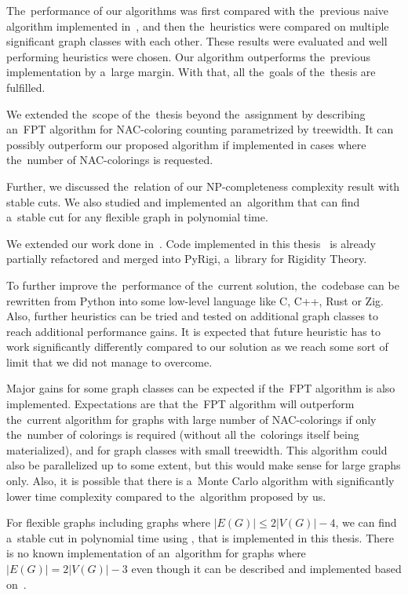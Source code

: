 The~performance of our algorithms was
first compared with the~previous naive algorithm implemented in~\flexrilog{},
and then the~heuristics were compared on multiple significant graph classes
with each other.
%
These results were evaluated and well performing heuristics were chosen.
Our algorithm outperforms the~previous implementation by a~large margin.
%
With that, all the~goals of the~thesis are fulfilled.

We extended the~scope of the~thesis beyond the~assignment by
describing an~FPT algorithm for NAC-coloring counting
parametrized by treewidth.
It can possibly outperform our proposed algorithm if implemented
in cases where the~number of NAC-colorings is requested.

Further, we discussed the~relation of our NP-completeness complexity result
with stable cuts.
We also studied and implemented an~algorithm that can find
a~stable cut for any flexible graph in polynomial time.

We extended our work done in~\cite{my_paper}.
Code implemented in this thesis~\cite{my_code} is already partially
refactored and merged into PyRigi, a~library for Rigidity Theory.


To further improve the~performance of the~current solution, the~codebase
can be rewritten from Python into some low-level language like C, C++, Rust or Zig.
Also, further heuristics can be tried
and tested on additional graph classes
to reach additional performance gains.
It is expected that future heuristic has to work significantly differently
compared to our solution as we reach some sort of limit
that we did not manage to overcome.

Major gains for some graph classes
can be expected if the~FPT algorithm is also implemented.
Expectations are that the~FPT algorithm will outperform the~current algorithm
for graphs with large number of NAC-colorings if only the~number of colorings
is required (without all the~colorings itself being materialized),
and for graph classes with small treewidth.
This algorithm could also be parallelized up to some extent,
but this would make sense for large graphs only.
%
Also, it is possible that there is a~Monte Carlo algorithm with significantly
lower time complexity compared to the~algorithm proposed by us.

For flexible graphs including graphs where \( |E(G)| \le 2|V(G)| - 4 \),
we can find a~stable cut in polynomial time using ,
that is implemented in this thesis.
There is no known implementation of an~algorithm
for graphs where \( |E(G)| = 2|V(G)| - 3 \)
even though it can be described and implemented
based on~\cite{stable_cuts_2v_3,stable_cuts_2v_3_revisit}.

